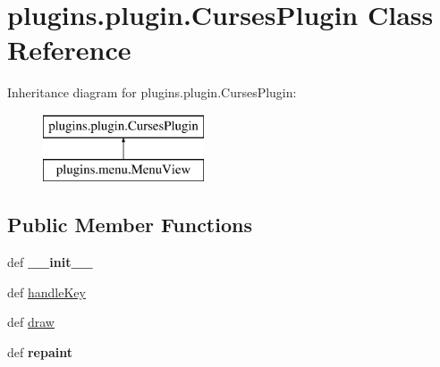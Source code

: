 \hypertarget{classplugins_1_1plugin_1_1_curses_plugin}{\section{plugins.\-plugin.\-Curses\-Plugin \-Class \-Reference}
\label{classplugins_1_1plugin_1_1_curses_plugin}
}
\-Inheritance diagram for plugins.\-plugin.\-Curses\-Plugin\-:\begin{figure}[H]
\begin{center}
\leavevmode
\includegraphics[height=2.000000cm]{classplugins_1_1plugin_1_1_curses_plugin}
\end{center}
\end{figure}
\subsection*{\-Public \-Member \-Functions}
\begin{DoxyCompactItemize}
\item 
\hypertarget{classplugins_1_1plugin_1_1_curses_plugin_a7dfd26b80b3427f79337e100053dca74}{def {\bfseries \-\_\-\-\_\-init\-\_\-\-\_\-}}\label{classplugins_1_1plugin_1_1_curses_plugin_a7dfd26b80b3427f79337e100053dca74}

\item 
def \hyperlink{classplugins_1_1plugin_1_1_curses_plugin_a4c40f3646ac95d9dc1e03f92ee1f7491}{handle\-Key}
\item 
def \hyperlink{classplugins_1_1plugin_1_1_curses_plugin_ae9cdc9674d47a60ce7e44c367a8c1404}{draw}
\item 
\hypertarget{classplugins_1_1plugin_1_1_curses_plugin_a4a0aa93ca4d0c63914646f8bf8b8f002}{def {\bfseries repaint}}\label{classplugins_1_1plugin_1_1_curses_plugin_a4a0aa93ca4d0c63914646f8bf8b8f002}

\end{DoxyCompactItemize}
